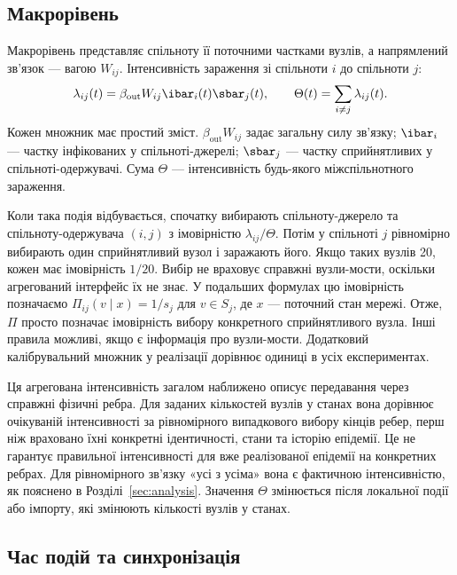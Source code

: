 \subsection{Макрорівень}
\label{sec:macro}

Макрорівень представляє спільноту її поточними частками вузлів, а напрямлений зв'язок --- вагою $W_{ij}$. Інтенсивність зараження зі спільноти $i$ до спільноти $j$:
\begin{equation}
\label{eq:macro_rate}
\lambda_{ij}(t)=\beta_{\mathrm{out}}W_{ij}\ibar_i(t)\sbar_j(t),
\qquad \Theta(t)=\sum_{i\neq j}\lambda_{ij}(t).
\end{equation}
Кожен множник має простий зміст. $\beta_{\mathrm{out}}W_{ij}$ задає загальну силу зв'язку; $\ibar_i$ --- частку інфікованих у спільноті-джерелі; $\sbar_j$ --- частку сприйнятливих у спільноті-одержувачі. Сума $\Theta$ --- інтенсивність будь-якого міжспільнотного зараження.

Коли така подія відбувається, спочатку вибирають спільноту-джерело та спільноту-одержувача $(i,j)$ з імовірністю $\lambda_{ij}/\Theta$. Потім у спільноті $j$ рівномірно вибирають один сприйнятливий вузол і заражають його. Якщо таких вузлів 20, кожен має імовірність $1/20$. Вибір не враховує справжні вузли-мости, оскільки агрегований інтерфейс їх не знає. У подальших формулах цю імовірність позначаємо $\Pi_{ij}(v\mid x)=1/s_j$ для $v\in S_j$, де $x$ --- поточний стан мережі. Отже, $\Pi$ просто позначає імовірність вибору конкретного сприйнятливого вузла. Інші правила можливі, якщо є інформація про вузли-мости. Додатковий калібрувальний множник у реалізації дорівнює одиниці в усіх експериментах.

Ця агрегована інтенсивність загалом наближено описує передавання через справжні фізичні ребра. Для заданих кількостей вузлів у станах вона дорівнює очікуваній інтенсивності за рівномірного випадкового вибору кінців ребер, перш ніж враховано їхні конкретні ідентичності, стани та історію епідемії. Це не гарантує правильної інтенсивності для вже реалізованої епідемії на конкретних ребрах. Для рівномірного зв'язку «усі з усіма» вона є фактичною інтенсивністю, як пояснено в Розділі~\ref{sec:analysis}. Значення $\Theta$ змінюється після локальної події або імпорту, які змінюють кількості вузлів у станах.

\subsection{Час подій та синхронізація}
\label{sec:timing}

